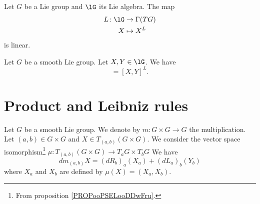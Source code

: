 \begin{proposition}      \label{PROPooWWXKooWEBpMf}
	Let \( G\) be a Lie group and \( \lG\) its Lie algebra. The map
	\begin{equation}
		\begin{aligned}
			L\colon \lG & \to \Gamma(TG) \\
			X           & \mapsto X^L
		\end{aligned}
	\end{equation}
	is linear.
\end{proposition}


\begin{proposition}	\label{PROPooPYVRooFtRGaj}
	Let \( G\) be a smooth Lie group. Let \( X,Y\in \lG\). We have
	\begin{equation}
		[X^L,Y^L]=[X,Y]^L.
	\end{equation}
\end{proposition}


\section{Product and Leibniz rules}


\begin{proposition}	\label{PROPooPPJJooBQgHMd}
	Let \( G\) be a smooth Lie group. We denote by \(m \colon G\times G\to G  \) the multiplication. Let \( (a,b)\in G\times G\) and \( X\in T_{(a,b)}(G\times G)\). We consider the vector space isomorphism\footnote{From proposition \ref{PROPooPSELooDDwFru}.} \(\mu \colon T_{(a,b)}(G\times G)\to T_aG\times T_bG  \)
	We have
	\begin{equation}
		dm_{(a,b)}X=(dR_b)_a(X_a)+(dL_a)_b(Y_b)
	\end{equation}
	where \( X_a\) and \( X_b\) are defined by \( \mu(X)=(X_a,X_b)\).
\end{proposition}

